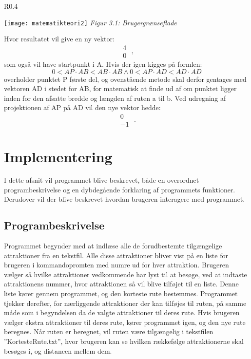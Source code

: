 \begin{wrapfigure}{R}{0.4\textwidth}
  \vspace{-60pt}
  \begin{center}
    \texttt{[image: matematikteori2]} \newline
    \textit{Figur 3.1: Brugergrænseflade}\newline
  \end{center}
  \vspace{-60pt}
\end{wrapfigure}

Hvor resultatet vil give en ny vektor: \[ \begin{matrix} 4 \\ 0 \end{matrix} \text{ ,} \]  som også vil have startpunkt i A. Hvis der igen kigges på formlen:
\[0 < AP \cdot AB < AB \cdot AB \wedge 0 < AP \cdot AD < AD \cdot AD \]
overholder punktet P første del, og ovenstående metode skal derfor gentages med vektoren AD i stedet for AB, for matematisk at finde ud af om punktet ligger inden 	for den afsatte bredde og længden af ruten a til b. Ved udregning af projektionen af AP på AD vil den nye vektor hedde: \[ \begin{matrix} 0 \\ -1 \end{matrix} \text{ .} \]


\section{Implementering}
I dette afsnit vil programmet blive beskrevet, både en overordnet programbeskrivelse og en dybdegående forklaring af programmets funktioner. Derudover vil der blive beskrevet hvordan brugeren interagere med programmet. 

\subsection{Programbeskrivelse}
Programmet begynder med at indlæse alle de forudbestemte tilgængelige attraktioner fra en tekstfil. Alle disse attraktioner bliver vist på en liste for brugeren i kommandopromten med numre ud for hver attraktion. Brugeren vælger så hvilke attraktioner vedkommende har lyst til at besøge, ved at indtaste attraktionens nummer, hvor attraktionen så vil blive tilføjet til en liste. Denne liste kører gennem programmet, og den korteste rute bestemmes. Programmet tjekker derefter, for nærliggende attraktioner der kan tilføjes til ruten, på samme måde som i begyndelsen da de valgte attraktioner til deres rute. Hvis brugeren vælger ekstra attraktioner til deres rute, kører programmet igen, og den nye rute beregnes. Når ruten er beregnet, vil ruten være tilgængelig i tekstfilen ”KortesteRute.txt”, hvor brugeren kan se hvilken rækkefølge attraktionerne skal besøges i, og distancen mellem dem. 

